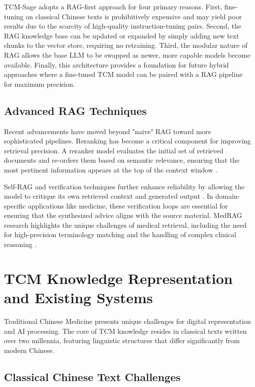 TCM-Sage adopts a RAG-first approach for four primary reasons. First, fine-tuning on classical Chinese texts is prohibitively expensive and may yield poor results due to the scarcity of high-quality instruction-tuning pairs. Second, the RAG knowledge base can be updated or expanded by simply adding new text chunks to the vector store, requiring no retraining. Third, the modular nature of RAG allows the base LLM to be swapped as newer, more capable models become available. Finally, this architecture provides a foundation for future hybrid approaches where a fine-tuned TCM model can be paired with a RAG pipeline for maximum precision.

\subsection{Advanced RAG Techniques}

Recent advancements have moved beyond "naive" RAG toward more sophisticated pipelines. Reranking has become a critical component for improving retrieval precision. A reranker model evaluates the initial set of retrieved documents and re-orders them based on semantic relevance, ensuring that the most pertinent information appears at the top of the context window \cite{gao2024rag}.

Self-RAG and verification techniques further enhance reliability by allowing the model to critique its own retrieved context and generated output \cite{asai2024selfrag}. In domain-specific applications like medicine, these verification loops are essential for ensuring that the synthesized advice aligns with the source material. MedRAG research highlights the unique challenges of medical retrieval, including the need for high-precision terminology matching and the handling of complex clinical reasoning \cite{luo2024medrag}.

\section{TCM Knowledge Representation and Existing Systems}

Traditional Chinese Medicine presents unique challenges for digital representation and AI processing. The core of TCM knowledge resides in classical texts written over two millennia, featuring linguistic structures that differ significantly from modern Chinese.

\subsection{Classical Chinese Text Challenges}

